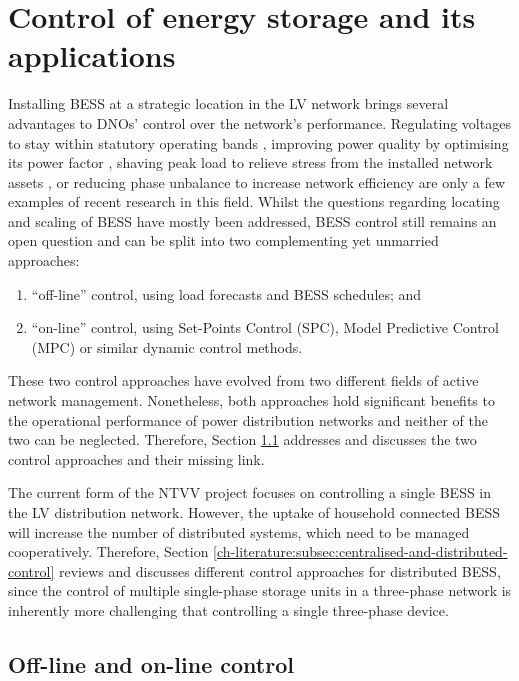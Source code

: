 \section{Control of energy storage and its applications}
\label{ch-literature:sec:control-of-energy-storage}

Installing BESS at a strategic location in the LV network brings several advantages to DNOs' control over the network's performance.
Regulating voltages to stay within statutory operating bands \cite{Yang2014}, improving power quality by optimising its power factor \cite{Chua2012b}, shaving peak load to relieve stress from the installed network assets \cite{Bennett2015}, or reducing phase unbalance to increase network efficiency \cite{Wang2015b} are only a few examples of recent research in this field.
Whilst the questions regarding locating and scaling of BESS have mostly been addressed, BESS control still remains an open question and can be split into two complementing yet unmarried approaches:

\begin{enumerate}
	\item ``off-line'' control, using load forecasts and BESS schedules; and
	\item ``on-line'' control, using Set-Points Control (SPC), Model Predictive Control (MPC) or similar dynamic control methods.
\end{enumerate}

These two control approaches have evolved from two different fields of active network management.
Nonetheless, both approaches hold significant benefits to the operational performance of power distribution networks and neither of the two can be neglected.
Therefore, Section \ref{ch-literature:subsec:off-line-and-on-line-control} addresses and discusses the two control approaches and their missing link.

The current form of the NTVV project focuses on controlling a single BESS in the LV distribution network.
However, the uptake of household connected BESS will increase the number of distributed systems, which need to be managed cooperatively.
Therefore, Section \ref{ch-literature:subsec:centralised-and-distributed-control} reviews and discusses different control approaches for distributed BESS, since the control of multiple single-phase storage units in a three-phase network is inherently more challenging that controlling a single three-phase device.

\subsection{Off-line and on-line control}
\label{ch-literature:subsec:off-line-and-on-line-control}


